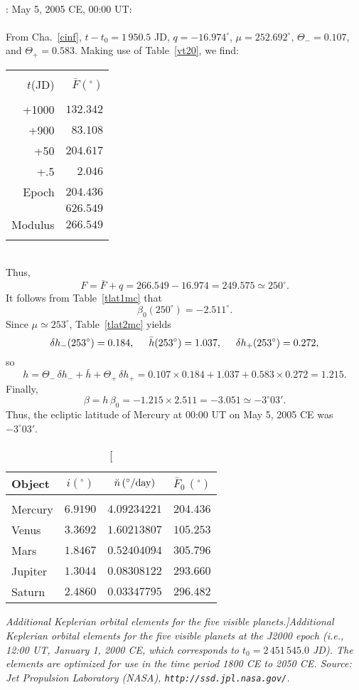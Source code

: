 ~\\
: May 5, 2005 CE, 00:00 UT:\\
~\\
From Cha.~\ref{cinf}, $t-t_0=1\,950.5$ JD, 
$q= -16.974^\circ$,  $\mu= 252.692^\circ$, $\Theta_-=0.107$, and
$\Theta_+ = 0.583$.
 Making use of
Table~\ref{vt20}, we find:\\
\begin{tabular}{rr}
&\\
$t$(JD) & $\bar{F}(^\circ)$\\[-2ex]
&\\
+1000 & $132.342$ \\
+900 & $83.108$\\
+50 & $204.617$ \\
+.5 & $2.046$\\
Epoch & $204.436$ \\\cline{2-2}
&$626.549$ \\\cline{2-2}
Modulus & $266.549$ \\ 
&\\
\end{tabular}\\
Thus,
$$
F = \bar{F} + q = 266.549-16.974= 249.575\simeq 250^\circ.
$$
It follows from Table~\ref{tlat1mc} that
$$
\beta_0(250^\circ) = -2.511^\circ.
$$
Since $\mu\simeq 253^\circ$, Table~\ref{tlat2mc} yields
$$
\delta h_-(253^\circ) = 0.184,\mbox{\hspace{0.5cm}}\bar{h}(253^\circ)=1.037, \mbox{\hspace{0.5cm}}\delta h_+(253^\circ) = 0.272,
$$
so
$$
h = \Theta_-\,\delta h_- + \bar{h}+\Theta_+\,\delta h_+ = 0.107\times 0.184+1.037+0.583\times 0.272= 1.215.
$$
Finally,
$$
\beta = h\,\beta_0 =- 1.215\times 2.511 = -3.051\simeq -3^\circ 03'.
$$
Thus,
the ecliptic latitude of Mercury at 00:00 UT on May 5, 2005 CE was $-3^\circ 03'$.

\clearpage
\begin{table}\centering
\begin{tabular}{l|ccc}
Object &  $i(^\circ)$& $\breve{n}\,(^\circ/{\rm day})$ & $\bar{F}_0\,(^\circ)$\\\hline
&&&\\[-2.2ex]
Mercury &  $6.9190$ & $4.09234221$ & $204.436$\\
Venus     &  $3.3692$ & $1.60213807$ & $105.253$ \\
Mars      &  $1.8467$  & $0.52404094$ & $305.796$ \\
Jupiter   &  $1.3044$  & $0.08308122$ & $293.660$ \\
Saturn   &  $2.4860$  & $0.03347795$ & $296.482$ \\
\end{tabular}
\caption[\em  Additional Keplerian orbital elements for the five visible planets.]{\em Additional Keplerian orbital elements for  the five visible planets at the J2000 epoch ({\em i.e.}, 12:00 UT, January 1, 2000 CE,
which corresponds to $t_0 = 2\,451\,545.0$ JD). The elements are optimized for use in the
time period 1800 CE to 2050 CE. Source: Jet Propulsion Laboratory (NASA), {\tt http://ssd.jpl.nasa.gov/}. }\label{tadd}
\end{table}

